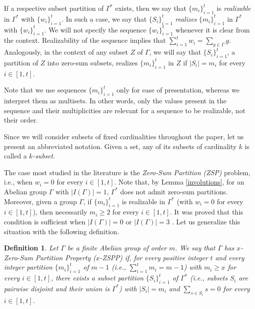 \documentclass[final]{dmtcs-episciences}
\newtheorem{dfn}[thm]{Definition}
\begin{document}
If a respective subset partition of $\Gamma^*$ exists, then we say that $\{m_i\}_{i=1}^t$ is \textit{realizable} in $\Gamma^*$ with $\{w_i\}_{i=1}^{t}$. In such a case, we say that $\{S_i\}_{i=1}^t$ \textit{realizes} $\{m_i\}_{i=1}^t$ in $\Gamma^*$ with $\{w_i\}_{i=1}^{t}$. We will not {specify} the sequence $\{w_i\}_{i=1}^{t}$ whenever it is clear from the context. Realizability of the sequence implies that $\sum_{i=1}^t w_i=\sum_{g\in \Gamma}g$. Analogously, in the context of any subset $Z$ of $\Gamma$, we will say that $\{S_i\}_{i=1}^t$, a partition of $Z$ into zero-sum subsets, realizes $\{m_i\}_{i=1}^t$ in $Z$ if $|S_i|=m_i$ for every {$i\in[1,t]$}.

Note that we use sequences $\{m_i\}_{i=1}^t$ only for ease of presentation, whereas we interpret them as multisets. In other words, only the values present in the sequence and their multiplicities are relevant for a sequence to be realizable, not their order. 

Since we will consider subsets of fixed cardinalities throughout the paper, let us present an abbreviated notation. Given a set, any of its subsets of cardinality $k$ is called a \textit{$k$-subset}.

The case most studied in the literature is the {\em Zero-Sum Partition (ZSP)} problem, i.e., when $w_i=0$ for every  {$i\in[1,t]$}. Note that,
by Lemma \ref{involutions}, for an Abelian group $\Gamma$ with $|I(\Gamma)|=1$, $\Gamma^*$ does not admit zero-sum partitions. Moreover, given a group $\Gamma$, if $\{m_i\}_{i=1}^t$ is realizable in $\Gamma^*$ (with $w_i=0$ for every {$i\in[1,t]$}), then necessarily $m_i\geq 2$ for every {$i\in[1,t]$}. It was proved that this condition is sufficient when $|I(\Gamma)|=0$  \citep{Tannenbaum1,Zeng} or $|I(\Gamma)|=3$ \citep{Zeng}. Let us generalize this situation with the following definition.

\begin{dfn}Let $\Gamma$ be a finite Abelian group of order $m$. We say that $\Gamma$ has {\em $x$-Zero-Sum Partition Property ($x$-ZSPP)} if, for every positive integer $t$ and every integer partition $\{m_i\}_{i=1}^t$ of $m-1$ (i.e., $\sum_{i=1}^t m_i=m-1$) with $m_i \geq x$ for every  {$i\in[1,t]$}, there exists a subset partition $\{S_i\}_{i=1}^t$ of $\Gamma^*$ (i.e., subsets $S_i$ are pairwise disjoint and their union is $ \Gamma^*$) with $|S_i| = m_i$ and $\sum_{s\in S_i}s = 0$ for every {$i\in[1,t]$}. %
\end{dfn}
\end{document}
